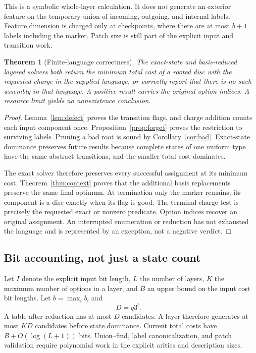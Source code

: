 \documentclass[11pt,letterpaper]{article}
\newtheorem{theorem}{Theorem}[section]
\theoremstyle{definition}
\begin{document}
This is a symbolic whole-layer calculation. It does not generate an exterior feature on the temporary union of incoming, outgoing, and internal labels. Feature dimension is charged only at checkpoints, where there are at most $b+1$ labels including the marker. Patch size is still part of the explicit input and transition work.

\begin{theorem}[Finite-language correctness]\label{thm:solver}
The exact-state and basis-reduced layered solvers both return the minimum total cost of a rooted disc with the requested charge in the supplied language, or correctly report that there is no such assembly in that language. A positive result carries the original option indices. A resource limit yields no nonexistence conclusion.
\end{theorem}
\begin{proof}
Lemma~\ref{lem:defect} proves the transition flags, and charge addition counts each input component once. Proposition~\ref{prop:forget} proves the restriction to surviving labels. Pruning a bad root is sound by Corollary~\ref{cor:bad}. Exact-state dominance preserves future results because complete states of one uniform type have the same abstract transitions, and the smaller total cost dominates.

The exact solver therefore preserves every successful assignment at its minimum cost. Theorem~\ref{thm:context} proves that the additional basis replacements preserve the same final optimum. At termination only the marker remains; its component is a disc exactly when its flag is good. The terminal charge test is precisely the requested exact or nonzero predicate. Option indices recover an original assignment. An interrupted enumeration or reduction has not exhausted the language and is represented by an exception, not a negative verdict.
\end{proof}

\subsection{Bit accounting, not just a state count}
Let $I$ denote the explicit input bit length, $L$ the number of layers, $K$ the maximum number of options in a layer, and $B$ an upper bound on the input cost bit lengths. Let $b=\max_i b_i$ and
\[
 D=q3^b.
\]
A table after reduction has at most $D$ candidates. A layer therefore generates at most $KD$ candidates before state dominance. Current total costs have $B+O(\log(L+1))$ bits. Union--find, label canonicalization, and patch validation require polynomial work in the explicit arities and description sizes.
\end{document}

